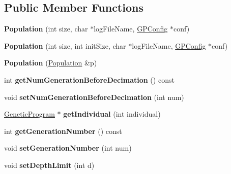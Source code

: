 \subsection*{Public Member Functions}
\begin{DoxyCompactItemize}
\item 
\hypertarget{classPopulation_a8ddb40058bdb88365e0cebe9ca92ddec}{}\label{classPopulation_a8ddb40058bdb88365e0cebe9ca92ddec} 
{\bfseries Population} (int size, char $\ast$log\+File\+Name, \hyperlink{classGPConfig}{G\+P\+Config} $\ast$conf)
\item 
\hypertarget{classPopulation_aa1d072ac78ec85f51655a037bb8a7398}{}\label{classPopulation_aa1d072ac78ec85f51655a037bb8a7398} 
{\bfseries Population} (int size, int init\+Size, char $\ast$log\+File\+Name, \hyperlink{classGPConfig}{G\+P\+Config} $\ast$conf)
\item 
\hypertarget{classPopulation_ad3ff445634fd12511f52cc132526e7a9}{}\label{classPopulation_ad3ff445634fd12511f52cc132526e7a9} 
{\bfseries Population} (\hyperlink{classPopulation}{Population} \&p)
\item 
\hypertarget{classPopulation_a29a9459c191db37b5c83f7e59fb95191}{}\label{classPopulation_a29a9459c191db37b5c83f7e59fb95191} 
int {\bfseries get\+Num\+Generation\+Before\+Decimation} () const
\item 
\hypertarget{classPopulation_a45937bd5e6f7c798b3b4799827073e59}{}\label{classPopulation_a45937bd5e6f7c798b3b4799827073e59} 
void {\bfseries set\+Num\+Generation\+Before\+Decimation} (int num)
\item 
\hypertarget{classPopulation_a6b8cee653f903490310744b3eaf68599}{}\label{classPopulation_a6b8cee653f903490310744b3eaf68599} 
\hyperlink{classGeneticProgram}{Genetic\+Program} $\ast$ {\bfseries get\+Individual} (int individual)
\item 
\hypertarget{classPopulation_a3026360d53e420e29b6e92c9dce423df}{}\label{classPopulation_a3026360d53e420e29b6e92c9dce423df} 
int {\bfseries get\+Generation\+Number} () const
\item 
\hypertarget{classPopulation_a5b30c3f60f1aa578884850c4b3d7db97}{}\label{classPopulation_a5b30c3f60f1aa578884850c4b3d7db97} 
void {\bfseries set\+Generation\+Number} (int num)
\item 
\hypertarget{classPopulation_afab7c52ec951860d6d9a2daff217f790}{}\label{classPopulation_afab7c52ec951860d6d9a2daff217f790} 
void {\bfseries set\+Depth\+Limit} (int d)
\item 
\hypertarget{classPopulation_ae21576ee423094b5bd448de6142ad57e}{}\label{classPopulation_ae21576ee423094b5bd448de6142ad57e} 

\end{DoxyCompactItemize}

